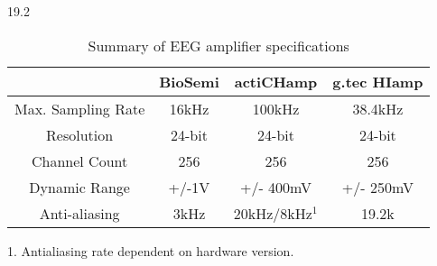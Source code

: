 19.2\begin{table}[]
\centering
\caption{Summary of EEG amplifier specifications} 
\label{tableeeg}
\begin{tabular}{|c|c|c|c|}
\hline
\textbf{}          & \textbf{BioSemi} & \textbf{actiCHamp} & \textbf{g.tec HIamp} \\ \hline
Max. Sampling Rate & 16kHz            & 100kHz             & 38.4kHz              \\ \hline
Resolution         & 24-bit           & 24-bit             & 24-bit               \\ \hline
Channel Count      & 256              & 256                & 256                  \\ \hline
Dynamic Range      & +/-1V            & +/- 400mV          & +/- 250mV            \\ \hline
Anti-aliasing      & 3kHz             & 20kHz/8kHz$^{1}$         &  19.2k       \\ \hline
\end{tabular}
\end{table}

1. Antialiasing rate dependent on hardware version.